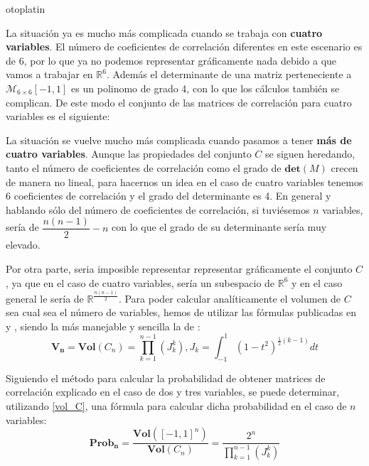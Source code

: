 otoplatin\documentclass[a4paper,openright,12pt]{report}
\begin{document}
La situación ya es mucho más complicada cuando se trabaja con \textbf{cuatro variables}. El número de coeficientes de correlación diferentes en este escenario es de 6, por lo que ya no podemos representar gráficamente nada debido a que vamos a trabajar en $\mathbb{R}^6$. Además el determinante de una matriz perteneciente a $\mathcal{M}_{6\times  6}[-1,1]$ es un polinomo de grado 4, con lo que los cálculos también se complican. De este modo el conjunto de las matrices de correlación para cuatro variables es el siguiente:

La situación se vuelve mucho más complicada cuando pasamos a tener \textbf{más de cuatro variables}. Aunque las propiedades del conjunto $C$ se siguen heredando, tanto el número de coeficientes de correlación como el grado de $\mathbf{det}(M)$ crecen de manera no lineal, para hacernos un idea en el caso de cuatro variables tenemos 6 coeficientes de correlación y el grado del determinante es 4. En general y hablando sólo del número de coeficientes de correlación, si tuviésemos $n$ variables, sería de $\dfrac{n(n-1)}{2}-n$ con lo que el grado de su determinante sería muy elevado.

Por otra parte, seria imposible representar representar gráficamente el conjunto $C$, ya que en el caso de cuatro variables, sería un subespacio de $\mathbb{R}^6$ y en el caso general le sería de $\mathbb{R}^{\frac{n(n-1)}{2}}$. Para poder calcular analíticamente el volumen de $C$ sea cual sea el número de variables, hemos de utilizar las fórmulas publicadas en \cite{Joe2005} y \cite{Hurliman2012}, siendo la más manejable y sencilla la de \cite{Hurliman2012}:
\begin{equation}
\mathbf{V_{n}}=\mathbf{Vol}(C_{n})=\prod_{k=1}^{n-1}(J_{k}^{k}), J_{k}=\int_{-1}^{1}(1-t^{2})^{\frac{1}{2}(k-1)}dt
\label{vol_C}
\end{equation}

Siguiendo el método para calcular la probabilidad de obtener matrices de correlación explicado en el caso de dos y tres variables, se puede determinar, utilizando \ref{vol_C}, una fórmula para calcular dicha probabilidad en el caso de $n$ variables:
\begin{equation}
\mathbf{Prob_{n}}=\dfrac{\mathbf{Vol}([-1,1]^{n})}{\mathbf{Vol}(C_{n})}=\dfrac{2^{n}}{\prod_{k=1}^{n-1}(J_{k}^{k})}
\label{prob_matriz_corr}
\end{equation}
\end{document}
